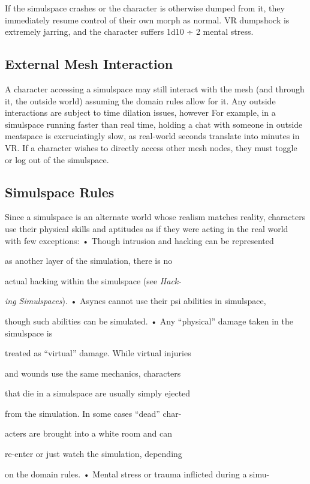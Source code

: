If the simulspace crashes or the character is otherwise
dumped from it, they immediately resume control
of their own morph as normal. VR dumpshock is
extremely jarring, and the character suffers 1d10 ÷ 2 
mental stress.

\subsection{External Mesh Interaction}

A character accessing a simulspace may still interact 
with the mesh (and through it, the outside world) 
assuming the domain rules allow for it. Any outside 
interactions are subject to time dilation issues, however
For example, in a simulspace running faster
than real time, holding a chat with someone in outside
meatspace is excruciatingly slow, as real-world
seconds translate into minutes in VR. If a character 
wishes to directly access other mesh nodes, they must 
toggle or log out of the simulspace.

\subsection{Simulspace Rules}

Since a simulspace is an alternate world whose realism 
matches reality, characters use their physical skills and 
aptitudes as if they were acting in the real world with 
few exceptions:
•  Though intrusion and hacking can be represented 

as another layer of the simulation, there is no 

actual hacking within the simulspace (see \textit{Hack-}

\textit{ing Simulspaces}).
•  Asyncs cannot use their psi abilities in simulspace, 

though such abilities can be simulated.
•  Any ``physical'' damage taken in the simulspace is 

treated as ``virtual'' damage. While virtual injuries 

and wounds use the same mechanics, characters 

that die in a simulspace are usually simply ejected 

from the simulation. In some cases ``dead'' char-

acters are brought into a white room and can 

re-enter or just watch the simulation, depending 

on the domain rules.
•  Mental stress or trauma inflicted during a simu-

